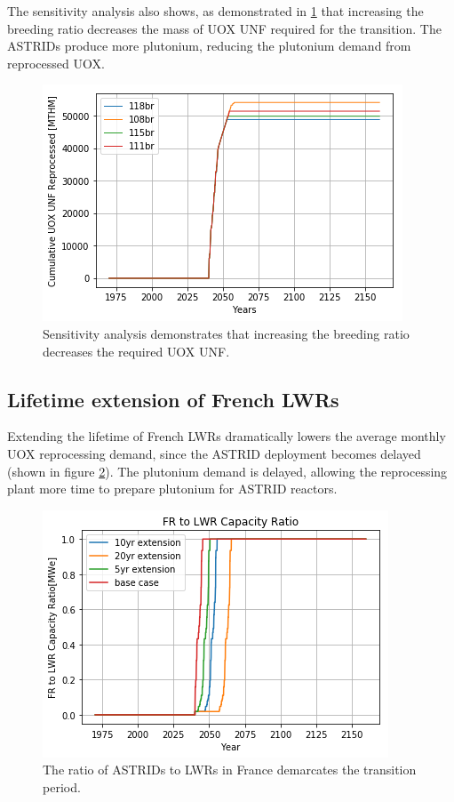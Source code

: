 The sensitivity analysis also shows, as demonstrated in \cref{fig:br_uox} that 
increasing the breeding ratio decreases the mass of \gls{UOX} \gls{UNF} 
required for the transition. The \glspl{ASTRID} produce more plutonium, reducing the plutonium demand from reprocessed \gls{UOX}.

\begin{figure}[htbp!]
    \begin{center}
        \includegraphics[scale=0.7]{./images/sensitivity/br_uox_unf_cum.png}
    \end{center}
    \caption{Sensitivity analysis demonstrates that increasing the breeding 
    ratio decreases the required \gls{UOX} \gls{UNF}. }
    \label{fig:br_uox}
\end{figure}

\FloatBarrier

\subsection{Lifetime extension of French \glspl{LWR}}\label{sec:life}
Extending the lifetime of French \glspl{LWR} dramatically lowers the average
monthly \gls{UOX} reprocessing demand, since the \gls{ASTRID} deployment becomes 
delayed (shown in figure \ref{fig:pow_diff}). The plutonium demand is delayed,
 allowing the reprocessing plant more time to prepare plutonium for \gls{ASTRID} reactors.

\begin{figure}[htbp!]
    \begin{center}
        \includegraphics[scale=0.7]{./images/sensitivity/pow_ratio.png}
    \end{center}
    \caption{The ratio of \glspl{ASTRID} to \glspl{LWR} in France demarcates 
    the transition period.}
    \label{fig:pow_diff}
\end{figure}

